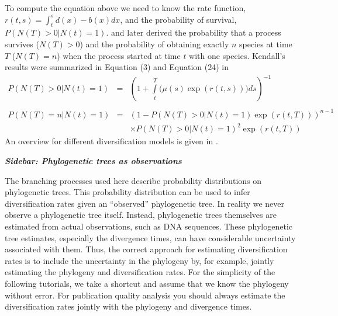 To compute the equation above we need to know the rate function, $r(t,s) = \int_t^s d(x)-b(x) dx$, and the probability of survival, $P(N(T)\!>\!0|N(t)\!=\!1)$.
\cite{Yule1925} and later \cite{Kendall1948} derived the probability that a process survives ($N(T) > 0$) and the probability of obtaining exactly $n$ species at time $T$ ($N(T) = n$) when the process started at time $t$ with one species.
Kendall's results were summarized in Equation (3) and Equation (24) in \cite{Nee1994b}
\begin{eqnarray}
P(N(T)\!>\!0|N(t)\!=\!1) & = & \left(1+\int\limits_t^{T} \bigg(\mu(s) \exp(r(t,s))\bigg) ds\right)^{-1} \label{eq:survival} \\ \nonumber \\
P(N(T)\!=\!n|N(t)\!=\!1) & = & (1-P(N(T)\!>\!0|N(t)\!=\!1)\exp(r(t,T)))^{n-1} \nonumber\\
& & \times P(N(T)\!>\!0|N(t)\!=\!1)^2 \exp(r(t,T)) \label{eq:N} %
\end{eqnarray}
An overview for different diversification models is given in \cite{Hoehna2015a}.



\begin{framed}
\textbf{\textit{Sidebar: Phylogenetic trees as observations}}

The branching processes used here describe probability distributions on phylogenetic trees. 
This probability distribution can be used to infer diversification rates given an ``observed'' phylogenetic tree.
In reality we never observe a phylogenetic tree itself.
Instead, phylogenetic trees themselves are estimated from actual observations, such as DNA sequences.
These phylogenetic tree estimates, especially the divergence times, can have considerable uncertainty associated with them.
Thus, the correct approach for estimating diversification rates is to include the uncertainty in the phylogeny by, for example, jointly estimating the phylogeny and diversification rates.
For the simplicity of the following tutorials, we take a shortcut and assume that we know the phylogeny without error.
For publication quality analysis you should always estimate the diversification rates jointly with the phylogeny and divergence times.
\end{framed}




